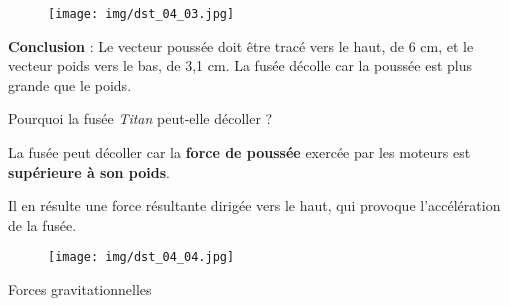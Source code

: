 \documentclass[answers]{exam}
\begin{document}
\begin{questions}
\begin{solution}
    \vspace{1em}

    \begin{figure}[H]
      \centering
      \texttt{[image: img/dst\_04\_03.jpg]}
      \captionsetup{labelformat=empty}
    \end{figure}
    
    
    \textbf{Conclusion} : Le vecteur poussée doit être tracé vers le haut, de 6 cm, et le vecteur poids vers le bas, de 3,1 cm. La fusée décolle car la poussée est plus grande que le poids.



    \end{solution}
  \question[0.5] Pourquoi la fusée \textit{Titan} peut-elle décoller ? 
  \begin{solution}
    La fusée peut décoller car la \textbf{force de poussée} exercée par les moteurs est \textbf{supérieure à son poids}.
    
    Il en résulte une force résultante dirigée vers le haut, qui provoque l’accélération de la fusée.

    \begin{figure}[H]
      \centering
      \texttt{[image: img/dst\_04\_04.jpg]}
      \captionsetup{labelformat=empty}
    \end{figure}

    \end{solution}

  \question[3.5] Forces gravitationnelles
\end{questions}
\end{document}
